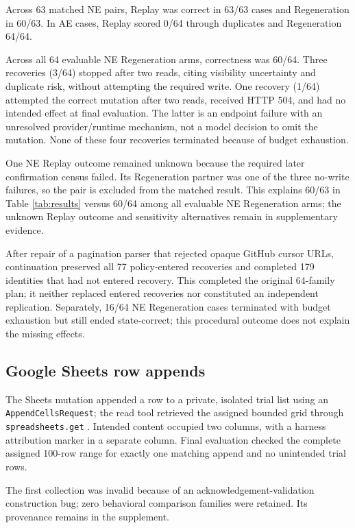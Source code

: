 \documentclass[conference]{IEEEtran}
\newcommand{\codeurl}[1]{{\def\UrlFont{\ttfamily}\nolinkurl{#1}}}
\begin{document}
Across 63 matched NE pairs, Replay was correct in 63/63 cases and Regeneration in 60/63. In AE cases, Replay scored 0/64 through duplicates and Regeneration 64/64.


Across all 64 evaluable NE Regeneration arms, correctness was 60/64. Three recoveries (3/64) stopped after two reads, citing visibility uncertainty and duplicate risk, without attempting the required write. One recovery (1/64) attempted the correct mutation after two reads, received HTTP 504, and had no intended effect at final evaluation. The latter is an endpoint failure with an unresolved provider/runtime mechanism, not a model decision to omit the mutation. None of these four recoveries terminated because of budget exhaustion.


One NE Replay outcome remained unknown because the required later confirmation census failed. Its Regeneration partner was one of the three no-write failures, so the pair is excluded from the matched result. This explains 60/63 in Table \ref{tab:results} versus 60/64 among all evaluable NE Regeneration arms; the unknown Replay outcome and sensitivity alternatives remain in supplementary evidence.


After repair of a pagination parser that rejected opaque GitHub cursor URLs, continuation preserved all 77 policy-entered recoveries and completed 179 identities that had not entered recovery. This completed the original 64-family plan; it neither replaced entered recoveries nor constituted an independent replication. Separately, 16/64 NE Regeneration cases terminated with budget exhaustion but still ended state-correct; this procedural outcome does not explain the missing effects.


\subsection{Google Sheets row appends}

{\raggedright The Sheets mutation appended a row to a private, isolated trial list using an \codeurl{AppendCellsRequest}; the read tool retrieved the assigned bounded grid through \codeurl{spreadsheets.get} \cite{sheets_append_cells,sheets_get}. Intended content occupied two columns, with a harness attribution marker in a separate column. Final evaluation checked the complete assigned 100-row range for exactly one matching append and no unintended trial rows.\par}


The first collection was invalid because of an acknowledgement-validation construction bug; zero behavioral comparison families were retained. Its provenance remains in the supplement.
\end{document}
